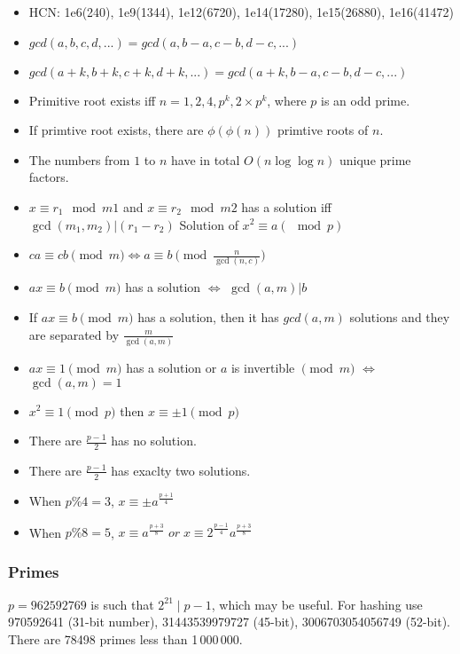 {\begin{itemize}[leftmargin=*, noitemsep]
\item HCN: 1e6(240), 1e9(1344), 1e12(6720), 1e14(17280), 1e15(26880), 1e16(41472)
\item \( gcd(a, b, c, d, ...) = gcd(a, b - a, c - b, d - c, ...) \)
\item \( gcd(a + k, b + k, c + k, d + k, ...) = gcd(a + k, b - a, c - b, d - c, ...) \)
\item Primitive root exists iff \( n = 1, 2, 4, p^k, 2\times p^k \), where \( p \) is an odd prime.
\item If primtive root exists, there are \( \phi(\phi(n)) \) primtive roots of \( n \).
\item The numbers from \( 1 \) to \( n \) have in total \( O(n\log\log n) \) unique prime factors.
\item \( x \equiv r_1 \mod m1 \) and \( x \equiv r_2 \mod m2 \) has a solution iff \( \gcd(m_1, m_2) | (r_1 - r_2) \)
Solution of \( x^2 \equiv a (\mod p) \)
\item \( ca \equiv cb \pmod{m} \iff a \equiv b \pmod{ \frac{n}{\gcd(n, c)}} \)
\item \( ax \equiv b \pmod{m} \) has a solution \( \iff \) \( \gcd(a, m) | b \)
\item If \( ax \equiv b \pmod{m} \) has a solution, then it has \( gcd(a, m) \) solutions and they are separated by \( \frac{m}{\gcd(a, m)} \)
\item \( ax \equiv 1 \pmod{m} \) has a solution or \( a \) is invertible \( \pmod{m} \) \( \iff \) \(\gcd(a, m) = 1 \)
\item \( x^2 \equiv 1 \pmod{p} \) then \( x \equiv \pm 1 \pmod{p} \)
\item There are \( \frac{p - 1}{2} \) has no solution.
\item There are \( \frac{p - 1}{2} \) has exaclty two solutions.
\item When \( p \% 4 = 3 \), \( x \equiv \pm a^{\frac{p + 1}{4}} \)
\item When \( p \% 8 = 5 \), \( x \equiv a^{\frac{p + 3}{8}} \; or \; x \equiv 2^{\frac{p - 1}{4}} a^{\frac{p + 3}{8}} \)
\end{itemize}

\subsubsection{Primes}
  $p=962592769$ is such that $2^{21} \mid p-1$, which may be useful. For hashing
  use 970592641 (31-bit number), 31443539979727 (45-bit), 3006703054056749
  (52-bit). There are 78498 primes less than 1\,000\,000.

}
